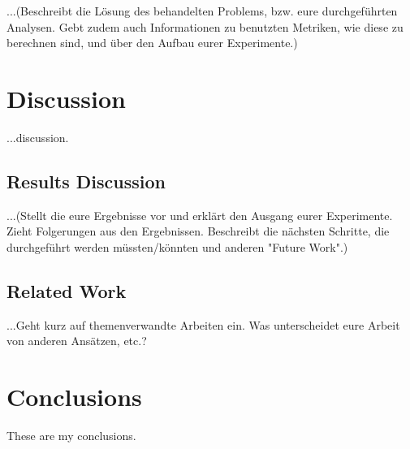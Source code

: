 \documentclass[pdftex,english,oribibl]{llncs}
\begin{document}
  ...(Beschreibt die Lösung des behandelten Problems, bzw. eure durchgeführten Analysen. Gebt zudem auch Informationen zu benutzten Metriken, wie diese zu berechnen sind, und über den Aufbau eurer Experimente.)
  
  
\section{Discussion}\label{sec:discussion}

  ...discussion.
  
    \subsection{Results Discussion} 
    ...(Stellt die eure Ergebnisse vor und erklärt den Ausgang eurer Experimente. Zieht Folgerungen aus den Ergebnissen. Beschreibt die nächsten Schritte, die durchgeführt werden müssten/könnten und anderen "Future Work".)
    
    \subsection{Related Work}
    ...Geht kurz auf themenverwandte Arbeiten ein. Was unterscheidet eure Arbeit von anderen Ansätzen, etc.?

\section{Conclusions}\label{sec:conclusions}

  These are my conclusions.
  

\end{document}
